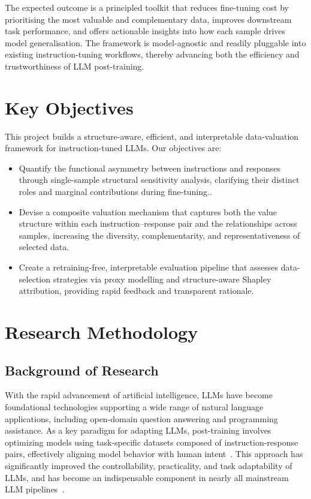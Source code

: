 \documentclass[12pt,a4paper]{article}
\begin{document}
The expected outcome is a principled toolkit that reduces fine-tuning cost by prioritising the most valuable and complementary data, improves downstream task performance, and offers actionable insights into how each sample drives model generalisation. The framework is model-agnostic and readily pluggable into existing instruction-tuning workflows, thereby advancing both the efficiency and trustworthiness of LLM post-training.


\vspace{-10pt}
\section{Key Objectives}

This project builds a structure-aware, efficient, and interpretable data-valuation framework for instruction-tuned LLMs. Our objectives are:

\begin{itemize}[leftmargin=*]
\item Quantify the functional asymmetry between instructions and responses through single-sample structural sensitivity analysis, clarifying their distinct roles and marginal contributions during fine-tuning..

\item Devise a composite valuation mechanism that captures both the value structure within each instruction–response pair and the relationships across samples, increasing the diversity, complementarity, and representativeness of selected data.

\item Create a retraining-free, interpretable evaluation pipeline that assesses data-selection strategies via proxy modelling and structure-aware Shapley attribution, providing rapid feedback and transparent rationale.
\end{itemize}



\vspace{-20pt}
\section{Research Methodology}
\vspace{-10pt}

\subsection{Background of Research}
\label{sec:background}
With the rapid advancement of artificial intelligence, LLMs have become foundational technologies supporting a wide range of natural language applications, including open-domain question answering and programming assistance. As a key paradigm for adapting LLMs, post-training involves optimizing models using task-specific datasets composed of instruction-response pairs, effectively aligning model behavior with human intent~\cite{DBLP:journals/corr/abs-2308-10792}. This approach has significantly improved the controllability, practicality, and task adaptability of LLMs, and has become an indispensable component in nearly all mainstream LLM pipelines~\cite{DBLP:journals/jmlr/ChungHLZTFL00BW24}.
\end{document}
